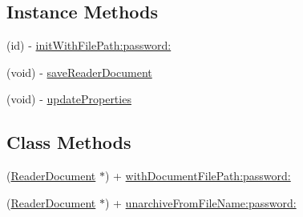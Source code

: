 \subsection*{Instance Methods}
\begin{DoxyCompactItemize}
\item 
(id) -\/ \hyperlink{interface_reader_document_af33867630b0ddabb164d3c23aca88b02}{init\-With\-File\-Path\-:password\-:}
\item 
(void) -\/ \hyperlink{interface_reader_document_a4566989b0714e4a959806ab6b81b4c61}{save\-Reader\-Document}
\item 
(void) -\/ \hyperlink{interface_reader_document_abaa0f925596750005438de7667b115a9}{update\-Properties}
\end{DoxyCompactItemize}
\subsection*{Class Methods}
\begin{DoxyCompactItemize}
\item 
(\hyperlink{interface_reader_document}{Reader\-Document} $\ast$) + \hyperlink{interface_reader_document_a45e97f0c02ba91018b7ccac3b8b5d255}{with\-Document\-File\-Path\-:password\-:}
\item 
(\hyperlink{interface_reader_document}{Reader\-Document} $\ast$) + \hyperlink{interface_reader_document_a3567d59bbbccc7c57f079e651d13c364}{unarchive\-From\-File\-Name\-:password\-:}
\end{DoxyCompactItemize}
